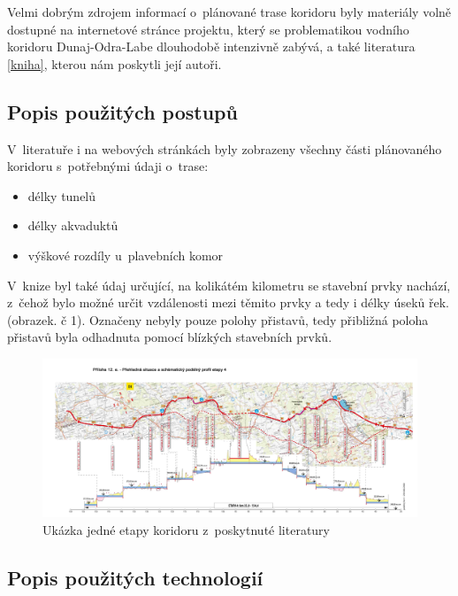\documentclass[11pt,a4paper]{article}
\begin{document}
    Velmi dobrým zdrojem informací o~plánované trase koridoru byly materiály
    volně dostupné na internetové stránce projektu, který se problematikou
    vodního koridoru Dunaj-Odra-Labe dlouhodobě intenzivně zabývá, a také
    literatura \ref{kniha}, kterou nám poskytli její autoři.

    \subsection{Popis použitých postupů}

      V~literatuře i na webových stránkách byly zobrazeny všechny části
      plánovaného koridoru s~potřebnými údaji o~trase:
      \begin{itemize}
        \item délky tunelů
        \item délky akvaduktů
        \item výškové rozdíly u~plavebních komor
      \end{itemize}

      V~knize byl také údaj určující, na kolikátém kilometru se stavební prvky
      nachází, z~čehož bylo možné určit vzdálenosti mezi těmito prvky a tedy i
      délky úseků řek. (obrazek. č 1).  Označeny nebyly pouze polohy přistavů,
      tedy přibližná poloha přistavů byla odhadnuta pomocí blízkých stavebních
      prvků.

    \begin{figure}[ht!]
      \centering
      \includegraphics[width=1\textwidth, natwidth=6969, natheight=2953]
                      {etapa4.jpg}
      \caption{Ukázka jedné etapy koridoru z~poskytnuté literatury
      \label{overflow}}
    \end{figure}

    \subsection{Popis použitých technologií}
\end{document}
